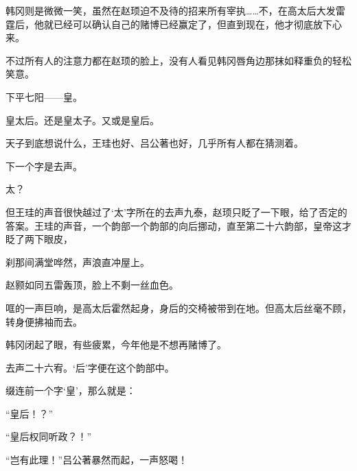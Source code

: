 韩冈则是微微一笑，虽然在赵顼迫不及待的招来所有宰执……不，在高太后大发雷霆后，他就已经可以确认自己的赌博已经赢定了，但直到现在，他才彻底放下心来。

不过所有人的注意力都在赵顼的脸上，没有人看见韩冈唇角边那抹如释重负的轻松笑意。

下平七阳——皇。

皇太后。还是皇太子。又或是皇后。

天子到底想说什么，王珪也好、吕公著也好，几乎所有人都在猜测着。

下一个字是去声。

太？

但王珪的声音很快越过了‘太’字所在的去声九泰，赵顼只眨了一下眼，给了否定的答案。王珪的声音，一个韵部一个韵部的向后挪动，直至第二十六韵部，皇帝这才眨了两下眼皮，

刹那间满堂哗然，声浪直冲屋上。

赵颢如同五雷轰顶，脸上不剩一丝血色。

哐的一声巨响，是高太后霍然起身，身后的交椅被带到在地。但高太后丝毫不顾，转身便拂袖而去。

韩冈闭起了眼，有些疲累，今年他是不想再赌博了。

去声二十六宥。‘后’字便在这个韵部中。

缀连前一个字‘皇’，那么就是：

“皇后！？”

“皇后权同听政？！”

“岂有此理！”吕公著暴然而起，一声怒喝！

